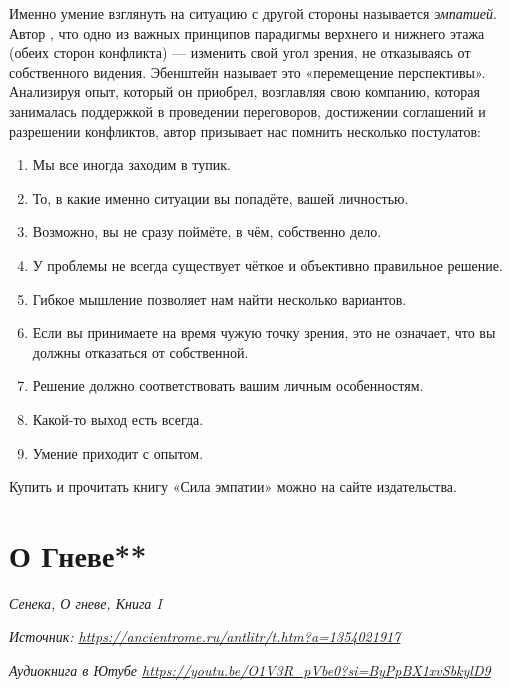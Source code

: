Именно умение взглянуть на ситуацию с другой стороны называется \textit{эмпатией}. Автор , что одно из важных принципов парадигмы верхнего и нижнего этажа (обеих сторон конфликта) --- изменить свой угол зрения, не отказываясь от собственного видения. Эбенштейн называет это «перемещение перспективы». Анализируя опыт, который он приобрел, возглавляя свою компанию, которая занималась поддержкой в проведении переговоров, достижении соглашений и разрешении конфликтов, автор призывает нас помнить несколько постулатов:

\begin{enumerate}
    \item Мы все иногда заходим в тупик.
    \item То, в какие именно  ситуации вы попадёте,  вашей личностью.
    \item Возможно, вы не сразу поймёте, в чём, собственно дело.
    \item У проблемы не всегда существует чёткое и объективно правильное решение.
    \item Гибкое мышление позволяет нам найти несколько вариантов.
    \item Если вы принимаете на время чужую точку зрения, это не означает, что вы должны отказаться от собственной.
    \item Решение должно соответствовать вашим личным особенностям.
    \item Какой-то выход есть всегда.
    \item Умение приходит с опытом.
\end{enumerate}

Купить и прочитать книгу «Сила эмпатии» можно на сайте издательства.

\clearpage

\section{О Гневе**}

\textit{Сенека, О гневе, Книга I}

\textit{Источник: \url{https://ancientrome.ru/antlitr/t.htm?a=1354021917}}

\textit{Аудиокнига в Ютубе \url{https://youtu.be/O1V3R_pVbe0?si=ByPpBX1xvSbkylD9}}


